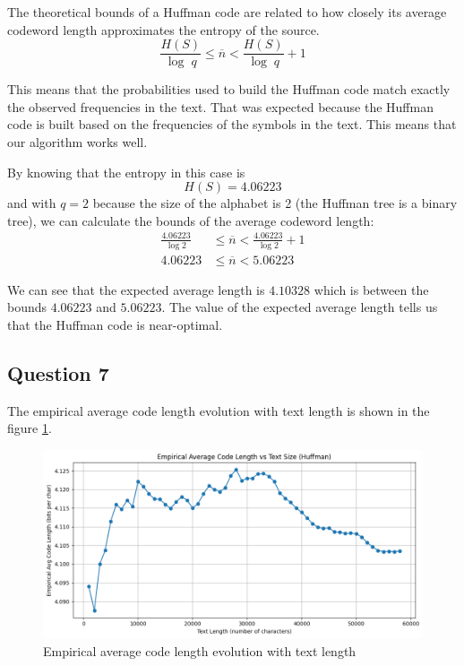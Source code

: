 \documentclass[]{template}
\begin{document}
    \noindent
    The theoretical bounds of a Huffman code are related to how closely its average codeword 
    length approximates the entropy of the source.
    \[
        \frac{H(S)}{\log \; q} \leq \overline{n} < \frac{H(S)}{\log \; q} + 1 
    \]

    \noindent
    This means that the probabilities used to build the Huffman code match exactly the observed frequencies in the text.
    That was expected because the Huffman code is built based on the frequencies of the symbols in the text.
    This means that our algorithm works well.

    \noindent
    By knowing that the entropy in this case is \[H(S) = 4.06223\] and 
    with $q = 2$ because the size of the alphabet is 2 (the Huffman tree is a binary tree), we can calculate the bounds of the average codeword length:
    \begin{align*}
        \frac{4.06223}{\log 2} &\leq \overline{n} < \frac{4.06223}{\log 2} + 1 \\
        4.06223 &\leq \overline{n} < 5.06223
    \end{align*}
    
    \noindent
    We can see that the expected average length is $4.10328$ which is between the bounds $4.06223$ and $5.06223$.
    The value of the expected average length tells us that the Huffman code is near-optimal.

    \subsection{Question 7}

    The empirical average code length evolution with text length is shown in the figure 
    \ref{fig:evolution_avg_code_length}.\\
    
    \begin{figure}[ht]
        \centering
        \includegraphics[width=1\textwidth]{Images/evolution_avg_code_length.png}
        \caption{Empirical average code length evolution with text length}
        \label{fig:evolution_avg_code_length}
    \end{figure}
\end{document}
